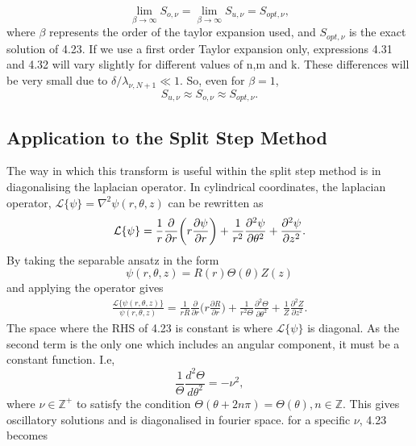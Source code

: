 \documentclass[10pt]{article}
\numberwithin{equation}{section}
\begin{document}
\begin{multicols}{2}
\begin{equation}
\lim_{\beta \to \infty}S_{o,\nu}= \lim_{\beta \to \infty}S_{u,\nu}=S_{opt,\nu},
\end{equation}
 where $\beta$ represents the order of the taylor expansion used, and $S_{opt,\nu}$ is the exact solution of 4.23. If we use a first order Taylor expansion only, expressions 4.31 and 4.32 will vary slightly for different values of n,m and k. These differences will be very small due to $\delta/\lambda_{\nu,N+1}\ll1$. So, even for $\beta=1$, 
\begin{equation}
S_{u,\nu}\approx S_{o,\nu}\approx S_{opt,\nu}.
\end{equation}

\subsection{Application to the Split Step Method}
The way in which this transform is useful within the split step method is in diagonalising the laplacian operator. In cylindrical coordinates, the laplacian operator, $\mathcal{L}\{\psi\}=\nabla^{2}\psi(r,\theta,z)$ can be rewritten as
\begin{equation}
\mathcal{L}\{\psi\}=\frac{1}{r}\frac{\partial}{\partial r}\bigg(r\frac{\partial\psi}{\partial r}\bigg) \\
+ \frac{1}{r^{2}}\frac{\partial^{2}\psi}{\partial\theta^{2}} + \frac{\partial^{2}\psi}{\partial z^{2}}.
\end{equation}
By taking the separable ansatz in the form
\begin{equation}
\psi(r,\theta,z)=R(r)\Theta(\theta)Z(z)
\end{equation}
and applying the operator gives
\begin{multline}
\frac{\mathcal{L}\{\psi(r,\theta,z)\}}{\psi(r,\theta,z)}=\frac{1}{rR}\frac{\partial}{\partial r}\bigg(r\frac{\partial R}{\partial r}\bigg)
+ \frac{1}{r^{2}\Theta}\frac{\partial^{2}\Theta}{\partial\theta^{2}} + \frac{1}{Z}\frac{\partial^{2}Z}{\partial z^{2}}.
\end{multline}
The space where the RHS of 4.23 is constant is where $\mathcal{L}\{\psi\}$ is diagonal. As the second term is the only one which includes an angular component, it must be a constant function. I.e,
\begin{equation}
\frac{1}{\Theta}\frac{d^{2}\Theta}{d\theta^{2}}=-\nu^{2},
\end{equation}
where  $\nu\in\mathbb{Z}^{+}$ to satisfy the condition $\Theta(\theta+2n\pi)=\Theta(\theta), n\in\mathbb{Z}$. This gives oscillatory solutions and is diagonalised in fourier space. for a specific $\nu$, 4.23 becomes


\end{multicols}
\end{document}
